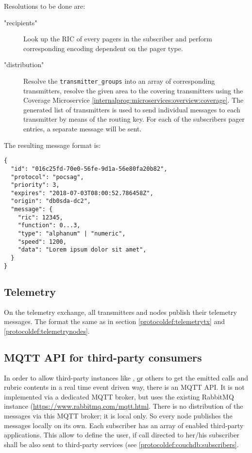 Resolutions to be done are:
\begin{description}
\item["recipients"] Look up the RIC of every pagers in the subscriber and perform corresponding encoding dependent on the pager type.
\item["distribution"] Resolve the \texttt{transmitter\_groups} into an array of corresponding transmitters, resolve the given area to the covering transmitters using the Coverage Microservice \ref{internalprog:microservices:overview:coverage}. The generated list of transmitters is used to send individual messages to each transmitter by means of the routing key. For each of the subscribers pager entries, a separate message will be sent.
\end{description}

The resulting message format is:
\begin{lstlisting}
{
  "id": "016c25fd-70e0-56fe-9d1a-56e80fa20b82",
  "protocol": "pocsag",
  "priority": 3,
  "expires": "2018-07-03T08:00:52.786458Z",
  "origin": "db0sda-dc2",
  "message": {
    "ric": 12345,
    "function": 0...3,
    "type": "alphanum" | "numeric",
    "speed": 1200,
    "data": "Lorem ipsum dolor sit amet",
  }
}
\end{lstlisting}


\subsection{Telemetry}
On the telemetry exchange, all transmitters and nodes publish their telemetry messages. The format the same as in section \ref{protocoldef:telemetrytx} and \ref{protocoldef:telemetrynodes}.

\subsection{MQTT API for third-party consumers}
\label{protocoldef:mqttapi}
In order to allow third-party instances like \href{http://www.aprs-is.net/|APRS}, \href{http://brandmeister.network|Brandmeister} or others to get the emitted calls and rubric contents in a real time event driven way, there is an MQTT API. It is not implemented via a dedicated MQTT broker, but uses the existing RabbitMQ instance (\url{https://www.rabbitmq.com/mqtt.html}. There is no distribution of the messages via this MQTT broker; it is local only. So every node publishes the messages locally on its own.
Each subscriber has an array of enabled third-party applications. This allow to define the user, if call directed to her/his subscriber shall be also sent to third-party services (see \ref{protocoldef:couchdb:subscribers}.


